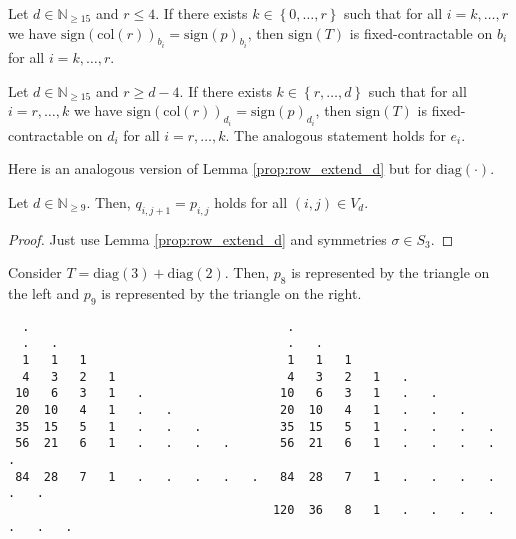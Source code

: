 \begin{proposition}\label{prop:fixed-contraction-homo-col}
    Let \( d \in \mathbb{N}_{\geq 15} \) and \( r \leq 4 \). If there exists \( k \in \left\{ 0, \dots, r \right\} \) such that for all \( i = k, \dots, r\) we have \(  \mathrm{sign}(\mathrm{col}(r))_{b_i} = \mathrm{sign}(p)_{b_i} \),
    then  \( \mathrm{sign}(T) \) is fixed-contractable on \( b_i \) for all \( i = k, \dots, r \).
\end{proposition}

\begin{proposition}\label{prop:23e232sdada2kmkl}
    Let \( d \in \mathbb{N}_{\geq 15} \) and \( r \geq d-4 \). If there exists \( k \in \left\{ r, \dots, d \right\} \) such that for all \( i = r, \dots, k\) we have \(  \mathrm{sign}(\mathrm{col}(r))_{d_i} = \mathrm{sign}(p)_{d_i} \),
then  \( \mathrm{sign}(T) \) is fixed-contractable on \( d_i \) for all \( i = r, \dots, k\). The analogous statement holds for \( e_i \).
\end{proposition}

Here is an analogous version of Lemma \ref{prop:row_extend_d} but for \( \mathrm{diag}(\cdot) \).

\begin{lemma}\label{prop:diag_extend_d}
    Let \( d \in \mathbb{N}_{\geq 9} \). Then, \( q_{i,j+1} = p_{i,j} \) holds for all \( (i,j) \in V_d \).
\end{lemma}

\begin{proof}
    Just use Lemma \ref{prop:row_extend_d} and symmetries \( \sigma \in S_3 \).
\end{proof}

\begin{example}
    Consider \( T = \mathrm{diag}(3) + \mathrm{diag}(2) \). Then, \( p_8 \) is represented by the triangle on the left and \( p_9 \) is represented by the triangle on the right.
    \begin{verbatim}
  .                                    .  
  .   .                                .   .  
  1   1   1                            1   1   1   
  4   3   2   1                        4   3   2   1   .
 10   6   3   1   .                   10   6   3   1   .   .
 20  10   4   1   .   .               20  10   4   1   .   .   .
 35  15   5   1   .   .   .           35  15   5   1   .   .   .   .
 56  21   6   1   .   .   .   .       56  21   6   1   .   .   .   .   .
 84  28   7   1   .   .   .   .   .   84  28   7   1   .   .   .   .   .   .
                                     120  36   8   1   .   .   .   .   .   .   . 
\end{verbatim}
\end{example}

